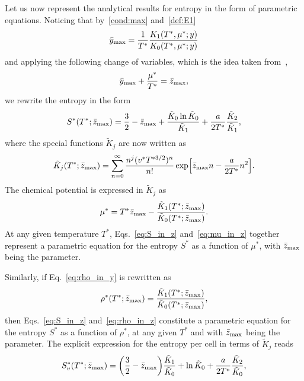 \documentclass[entropy,article,submit,pdftex,moreauthors]{Definitions/mdpi}
\begin{document}
Let us now represent the analytical results for entropy in the form of parametric equations. Noticing that by~\eqref{cond:max} and~\eqref{def:E1}
\begin{equation}
	\bar{y}_{\rm max} = \frac{1}{T^*}\frac{K_1(T^*,\mu^*;y)}{K_0(T^*,\mu^*;y)}
\end{equation}
and applying the following change of variables, which is the idea taken from~\citep{KD22},
\begin{equation}
	\bar{y}_{\rm max} + \frac{\mu^*}{T^*} = \bar{z}_{\rm max},
\end{equation}
we rewrite the entropy in the form
\begin{equation}
	\label{eq:S_in_z}
	S^*(T^*;\bar{z}_{\rm max}) = \frac{3}{2} - \bar{z}_{\rm max} + \frac{\tilde{K}_0 \ln \tilde{K}_0}{\tilde{K}_1} + \frac{a}{2T^*} \frac{\tilde{K}_2}{\tilde{K}_1},
\end{equation}
where the special functions $\tilde{K}_j$ are now written as
\begin{equation}
	\tilde{K}_j(T^*;\bar{z}_{\rm max}) = \sum_{n=0}^{\infty} \frac{n^j (v^* T^{*3/2})^n}{n!} \exp[\bar{z}_{\rm max}n - \frac{a}{2T^*}n^2].
\end{equation}
The chemical potential is expressed in $\tilde{K}_j$ as
\begin{equation}
	\label{eq:mu_in_z}
	\mu^* = T^* \bar{z}_{\rm max} - \frac{\tilde{K}_1(T^*;\bar{z}_{\rm max})}{\tilde{K}_0(T^*;\bar{z}_{\rm max})}.
\end{equation}
At any given temperature $T^*$, Eqs.~\eqref{eq:S_in_z} and~\eqref{eq:mu_in_z} together represent a parametric equation for the entropy $S^*$ as a function of $\mu^*$, with $\bar{z}_{\rm max}$ being the parameter.

Similarly, if Eq.~\eqref{eq:rho_in_y} is rewritten as
\begin{equation}
	\label{eq:rho_in_z}
	\rho^*(T^*;\bar{z}_{\rm max}) = \frac{\tilde{K}_1(T^*;\bar{z}_{\rm max})}{\tilde{K}_0(T^*;\bar{z}_{\rm max})},
\end{equation}
then Eqs.~\eqref{eq:S_in_z} and~\eqref{eq:rho_in_z} constitute a parametric equation for the entropy $S^*$ as a function of $\rho^*$, at any given $T^*$ and with $\bar{z}_{\rm max}$ being the parameter.
The explicit expression for the entropy per cell in terms of $\tilde{K}_j$ reads
\begin{equation}
	\label{eq:S2_in_z}
	S^*_v(T^*;\bar{z}_{\rm max}) = \left(\frac{3}{2} - \bar{z}_{\rm max}\right) \frac{\tilde{K}_1}{\tilde{K}_0} + \ln \tilde{K}_0 + \frac{a}{2T^*} \frac{\tilde{K}_2}{\tilde{K}_0},
\end{equation}
\end{document}
